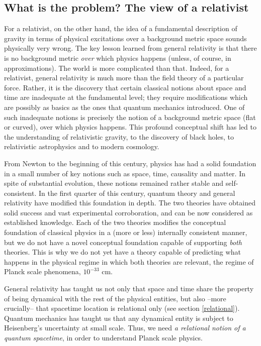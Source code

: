 \subsection{What is the problem? The view of a relativist}

For a relativist, on the other hand, the idea of a fundamental 
description of gravity in terms of physical excitations over a 
background metric space sounds physically very wrong.  The key lesson 
learned from general relativity is that there is no background metric 
\textit{over} which physics happens (unless, of course, in 
approximations).  The world is more complicated than that.  Indeed, 
for a relativist, general relativity is much more than the field 
theory of a particular force.  Rather, it is the discovery that 
certain classical notions about space and time are inadequate at the 
fundamental level; they require modifications which are possibly as 
basics as the ones that quantum mechanics introduced.  One of such 
inadequate notions is precisely the notion of a background metric 
space (flat or curved), over which physics happens.  This profound 
conceptual shift has led to the understanding of relativistic gravity, 
to the discovery of black holes, to relativistic astrophysics and to 
modern cosmology.

From Newton to the beginning of this century, physics has had a solid 
foundation in a small number of key notions such as space, time, 
causality and matter.  In spite of substantial evolution, these 
notions remained rather stable and self-consistent.  In the first 
quarter of this century, quantum theory and general relativity have 
modified this foundation in depth.  The two theories have obtained 
solid success and vast experimental corroboration, and can be now 
considered as established knowledge.  Each of the two theories 
modifies the conceptual foundation of classical physics in a (more or 
less) internally consistent manner, but we do not have a novel 
conceptual foundation capable of supporting \textit{both} theories.  
This is why we do not yet have a theory capable of predicting what 
happens in the physical regime in which both theories are relevant, 
the regime of Planck scale phenomena, $10^{-33}$ cm.

General relativity has taught us not only that space and time share 
the property of being dynamical with the rest of the physical 
entities, but also --more crucially-- that spacetime location is 
relational only (see section \ref{relational}).  Quantum mechanics has 
taught us that any dynamical entity is subject to Heisenberg's 
uncertainty at small scale.  Thus, we need {\em a relational notion of 
a quantum spacetime\/}, in order to understand Planck scale physics.

